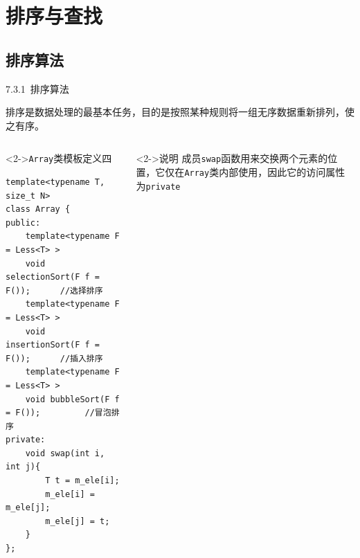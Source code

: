 
\section{排序与查找}

\subsection{排序算法}


\begin{frame}[fragile]{7.3.1~排序算法}

排序是数据处理的最基本任务，目的是按照某种规则将一组无序数据重新排列，使之有序。

\vspace{-4mm}
\begin{columns}[t]

\begin{blueblock}<2->{\texttt{Array}类模板定义四}
\vspace{-3mm}
\begin{lstlisting}[moreemph={Array,T}]
template<typename T, size_t N>
class Array {
public:
    template<typename F = Less<T> >
    void selectionSort(F f = F());      //选择排序
    template<typename F = Less<T> >
    void insertionSort(F f = F());      //插入排序
    template<typename F = Less<T> >
    void bubbleSort(F f = F());         //冒泡排序
private:
    void swap(int i, int j){
        T t = m_ele[i];
        m_ele[i] = m_ele[j];
        m_ele[j] = t;
    }
};
\end{lstlisting}
\vspace{-1mm}
\end{blueblock}

\begin{yellowblock}<2->{说明}
成员\texttt{swap}函数用来交换两个元素的位置，它仅在\texttt{Array}类内部使用，因此它的访问属性为\texttt{private}
\end{yellowblock}

\end{columns}

\end{frame}


